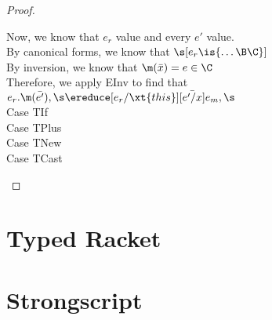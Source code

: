 \documentclass{report}
\begin{document}
\begin{proof}
\begin{tabbing}
\> Now, we know that $e_r$ value and every $e'$ value.\\
\> By canonical forms, we know that $\s[e_r \is \{ \ldots \B \C\}]$\\
\> By inversion, we know that $\m(\bar{x}) = e \in \C$\\
\> Therefore, we apply EInv to find that $e_r.\m(\bar{e'}),\s \ereduce [e_r/\xt{this}][\bar{e'/x}]e_m,\s$ \\
Case TIf\\
Case TPlus\\
Case TNew\\
Case TCast\\
\end{tabbing}
\end{proof}
\section{Typed Racket}
\section{Strongscript}
\end{document}
